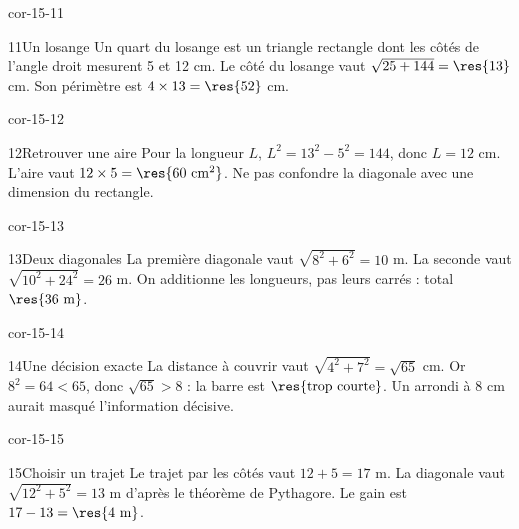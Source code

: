 \begin{blocLivre}{cor-15-11}\begin{corrige}{11}{Un losange}
Un quart du losange est un triangle rectangle dont les côtés de l’angle droit mesurent 5 et 12 cm. Le côté du losange vaut $\sqrt{25+144}=\res{13}$ cm. Son périmètre est $4\times13=\res{52}$ cm.
\label{fig-cor-15-11}
\end{corrige}\end{blocLivre}
\begin{blocLivre}{cor-15-12}\begin{corrige}{12}{Retrouver une aire}
Pour la longueur $L$, $L^2=13^2-5^2=144$, donc $L=12$ cm. L’aire vaut $12\times5=\res{60\ \mathrm{cm}^2}$. Ne pas confondre la diagonale avec une dimension du rectangle.
\label{fig-cor-15-12}
\end{corrige}\end{blocLivre}
\begin{blocLivre}{cor-15-13}\begin{corrige}{13}{Deux diagonales}
La première diagonale vaut $\sqrt{8^2+6^2}=10$ m. La seconde vaut $\sqrt{10^2+24^2}=26$ m. On additionne les longueurs, pas leurs carrés : total $\res{36\ \mathrm m}$.
\label{fig-cor-15-13}
\end{corrige}\end{blocLivre}
\begin{blocLivre}{cor-15-14}\begin{corrige}{14}{Une décision exacte}
La distance à couvrir vaut $\sqrt{4^2+7^2}=\sqrt{65}$ cm. Or $8^2=64<65$, donc $\sqrt{65}>8$ : la barre est $\res{\text{trop courte}}$. Un arrondi à 8 cm aurait masqué l’information décisive.
\label{fig-cor-15-14}
\end{corrige}\end{blocLivre}
\begin{blocLivre}{cor-15-15}\begin{corrige}{15}{Choisir un trajet}
Le trajet par les côtés vaut $12+5=17$ m. La diagonale vaut $\sqrt{12^2+5^2}=13$ m d’après le théorème de Pythagore. Le gain est $17-13=\res{4\ \mathrm m}$.
\label{fig-cor-15-15}
\end{corrige}\end{blocLivre}
